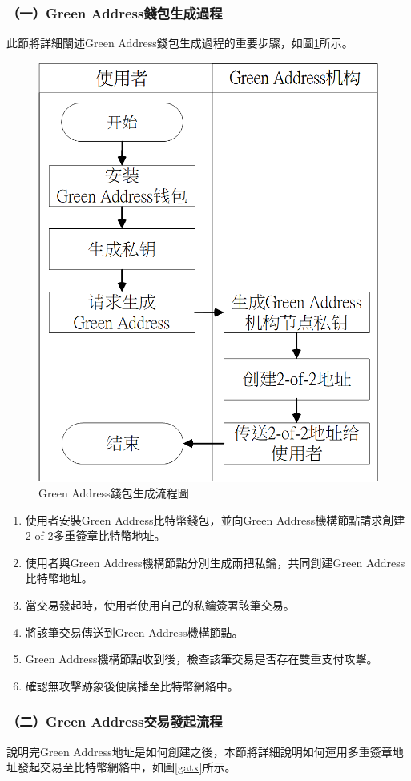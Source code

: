 			 	\subsubsection{（一）Green Address錢包生成過程}
			 	此節將詳細闡述Green Address錢包生成過程的重要步驟，如圖\ref{gabuild}所示。
			 	\begin{figure}[htbp]
					\centering
					\includegraphics[width = .5\textwidth]{gabuild.png}
					\caption{Green Address錢包生成流程圖}\label{gabuild}
				\end{figure}

			 	\begin{enumerate}
			 		\item 使用者安裝Green Address比特幣錢包，並向Green Address機構節點請求創建2-of-2多重簽章比特幣地址。
			 		\item 使用者與Green Address機構節點分別生成兩把私鑰，共同創建Green Address比特幣地址。
			 		\item 當交易發起時，使用者使用自己的私鑰簽署該筆交易。
			 		\item 將該筆交易傳送到Green Address機構節點。
			 		\item Green Address機構節點收到後，檢查該筆交易是否存在雙重支付攻擊。
			 		\item 確認無攻擊跡象後便廣播至比特幣網絡中。
			 	\end{enumerate}

			 	\subsubsection{（二）Green Address交易發起流程}
			 	說明完Green Address地址是如何創建之後，本節將詳細說明如何運用多重簽章地址發起交易至比特幣網絡中，如圖\ref{gatx}所示。

